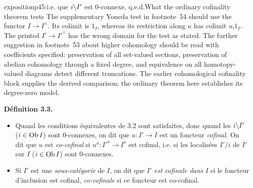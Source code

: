 \begin{dcomment}{exposition}{p45:i.e. que $i\backslash I'$ est 0-connexe, q.e.d.}{What the ordinary cofinality theorem tests}
The supplementary Yoneda test in footnote~54 should use the functor $I\longrightarrow I^{\wedge}$. Its colimit is $1_I$, whereas its restriction along $u$ has colimit $u_!1_{I'}$. The printed $I'\longrightarrow I'^{\wedge}$ has the wrong domain for the test as stated. The further suggestion in footnote~53 about higher cohomology should be read with coefficients specified: preservation of all set-valued sections, preservation of abelian cohomology through a fixed degree, and equivalence on all homotopy-valued diagrams detect different truncations. The earlier cohomological cofinality block supplies the derived comparison; the ordinary theorem here establishes its degree-zero model.
\end{dcomment}


\noindent\textbf{Définition 3.3.}
\begin{itemize}[label={}]
\item[a)] Quand les conditions équivalentes de 3.2 sont satisfaites, donc quand les $i\backslash I'$ ($i \in \operatorname{Ob} I$) sont 0-connexes, on dit que $u : I' \longrightarrow I$ est un foncteur \textit{cofinal.} On dit que $u$ est \textit{co-cofinal} si $u^o : I'^o \longrightarrow I^o$ est cofinal, i.e. si les localisées $I'/i$ de $I'$ sur $I$ ($i \in \operatorname{Ob} I$) sont 0-connexes.
\item[b)] Si $I'$ est une \textit{sous-catégorie} de $I$, on dit que $I'$ \textit{est cofinale dans} $I$ si le foncteur d'inclusion est cofinal, \textit{co-cofinale} si ce foncteur est co-cofinal.
\end{itemize}

